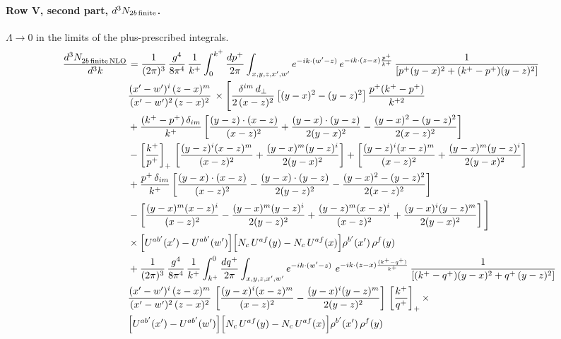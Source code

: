 \documentclass[10pt]{article}
\numberwithin{equation}{section}
\begin{document}
\paragraph{Row V, second part, $d^3N_{2b\,\rm finite}$.}
$\Lambda\to0$ in the limits of the plus-prescribed integrals.
\begin{align}
    \frac{d^{3}N_{2b\,\rm finite\, NLO}^{\rm}}{d^{3}k} & =  \frac{1}{(2\pi)^{3}}\,\frac{g^{4}}{8\pi^{4}}\,\frac{1}{k^{+}}\int_{0}^{k^{+}}\frac{dp^{+}}{2\pi}\int_{x,y,z,x',w'}e^{-ik\cdot(w'-z)}\,e^{-ik\cdot(z-x)\frac{p^{+}}{k^{+}}}\,\frac{1}{\left[p^{+}(y-x)^{2}+(k^{+}-p^{+})(y-z)^{2}\right]}\notag \\ & \frac{(x'-w')^{i}\,(z-x)^{m}}{(x'-w')^{2}\,(z-x)^{2}}\,\times\Bigg[\frac{\delta^{im}\,d_{\perp}}{2\,(x-z)^{2}}\left[(y-x)^{2}-(y-z)^{2}\right]\frac{p^{+}(k^{+}-p^{+})}{k^{+2}}
\notag \\ & +\frac{(k^{+}-p^{+})\,\delta_{im}}{k^{+}}\left[\frac{(y-z)\cdot(x-z)}{(x-z)^{2}}+\frac{(y-x)\cdot(y-z)}{2(y-x)^{2}}-\frac{(y-x)^{2}-(y-z)^{2}}{2(x-z)^{2}}\right]\notag\\
&-\left[\frac{k^{+}}{p^{+}}\right]_{+}\,\left[\frac{(y-z)^{i}(x-z)^{m}}{(x-z)^{2}}+\frac{(y-x)^{m}(y-z)^{i}}{2(y-x)^{2}}\right]+\left[\frac{(y-z)^{i}(x-z)^{m}}{(x-z)^{2}}+\frac{(y-x)^{m}(y-z)^{i}}{2(y-x)^{2}}\right]\notag\\
&+\frac{p^{+}\,\delta_{im}}{k^{+}}\left[\frac{(y-x)\cdot(x-z)}{(x-z)^{2}}-\frac{(y-x)\cdot(y-z)}{2(y-z)^{2}}-\frac{(y-x)^{2}-(y-z)^{2}}{2(x-z)^{2}}\right]\notag\\
&-\left[\frac{(y-x)^{m}(x-z)^{i}}{(x-z)^{2}}-\frac{(y-x)^{m}(y-z)^{i}}{2(y-z)^{2}}+\frac{(y-z)^{m}(x-z)^{i}}{(x-z)^{2}}+\frac{(y-x)^{i}(y-z)^{m}}{2(y-x)^{2}}\right]\Bigg]\notag\\
&\times\Big[U^{ab'}(x')-U^{ab'}(w')\Big]\Big[N_{c}\,U^{af}(y)-N_{c}\,U^{af}(x)\Big]\rho^{b'}(x')\,\rho^{f}(y) \notag \\
& + \frac{1}{(2\pi)^{3}}\,\frac{g^{4}}{8\pi^{4}}\,\frac{1}{k^{+}}\int_{k^{+}}^{0}\frac{dq^{+}}{2\pi}\int_{x,y,z,x',w'}e^{-ik\cdot(w'-z)}\ e^{-ik\cdot(z-x)\frac{(k^{+}-q^{+})}{k^{+}}}\,\frac{1}{\left[(k^{+}-q^{+})(y-x)^{2}+q^{+}\,(y-z)^{2}\right]}\notag \\ & \frac{(x'-w')^{i}\,(z-x)^{m}}{(x'-w')^{2}\,(z-x)^{2}}\,\left[\frac{(y-x)^{i}(x-z)^{m}}{(x-z)^{2}}-\frac{(y-x)^{i}(y-z)^{m}}{2(y-z)^{2}}\right]\,\left[\frac{k^{+}}{q^{+}}\right]_{+}\times\notag \\ & \Big[U^{ab'}(x')-U^{ab'}(w')\Big]\Big[N_{c}\,U^{af}(y)-N_{c}\,U^{af}(x)\Big]\rho^{b'}(x')\,\rho^{f}(y) \notag \\

\end{align}
\end{document}
